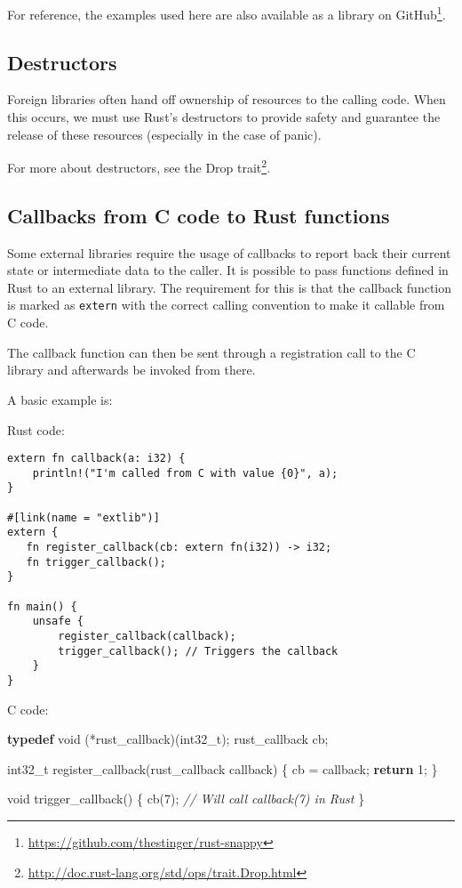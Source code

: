 \documentclass[a4paper,]{book}
\newenvironment{Shaded}{\begin{snugshade}}{\end{snugshade}}
\newcommand{\KeywordTok}[1]{\textcolor[rgb]{0.13,0.29,0.53}{\textbf{{#1}}}}
\newcommand{\DataTypeTok}[1]{\textcolor[rgb]{0.13,0.29,0.53}{{#1}}}
\newcommand{\DecValTok}[1]{\textcolor[rgb]{0.00,0.00,0.81}{{#1}}}
\newcommand{\CommentTok}[1]{\textcolor[rgb]{0.56,0.35,0.01}{\textit{{#1}}}}
\newcommand{\NormalTok}[1]{{#1}}
\renewcommand{\href}[2]{#2\footnote{\url{#1}}}
\begin{document}
For reference, the examples used here are also available as a
\href{https://github.com/thestinger/rust-snappy}{library on GitHub}.

\subsection{Destructors}\label{destructors}

Foreign libraries often hand off ownership of resources to the calling
code. When this occurs, we must use Rust's destructors to provide safety
and guarantee the release of these resources (especially in the case of
panic).

For more about destructors, see the
\href{http://doc.rust-lang.org/std/ops/trait.Drop.html}{Drop trait}.

\subsection{Callbacks from C code to Rust
functions}\label{callbacks-from-c-code-to-rust-functions}

Some external libraries require the usage of callbacks to report back
their current state or intermediate data to the caller. It is possible
to pass functions defined in Rust to an external library. The
requirement for this is that the callback function is marked as
\texttt{extern} with the correct calling convention to make it callable
from C code.

The callback function can then be sent through a registration call to
the C library and afterwards be invoked from there.

A basic example is:

Rust code:

\begin{verbatim}
extern fn callback(a: i32) {
    println!("I'm called from C with value {0}", a);
}

#[link(name = "extlib")]
extern {
   fn register_callback(cb: extern fn(i32)) -> i32;
   fn trigger_callback();
}

fn main() {
    unsafe {
        register_callback(callback);
        trigger_callback(); // Triggers the callback
    }
}
\end{verbatim}

C code:

\begin{Shaded}
\begin{Highlighting}[]
\KeywordTok{typedef} \DataTypeTok{void} \NormalTok{(*rust_callback)(}\DataTypeTok{int32_t}\NormalTok{);}
\NormalTok{rust_callback cb;}

\DataTypeTok{int32_t} \NormalTok{register_callback(rust_callback callback) \{}
    \NormalTok{cb = callback;}
    \KeywordTok{return} \DecValTok{1}\NormalTok{;}
\NormalTok{\}}

\DataTypeTok{void} \NormalTok{trigger_callback() \{}
  \NormalTok{cb(}\DecValTok{7}\NormalTok{); }\CommentTok{// Will call callback(7) in Rust}
\NormalTok{\}}
\end{Highlighting}
\end{Shaded}
\end{document}
